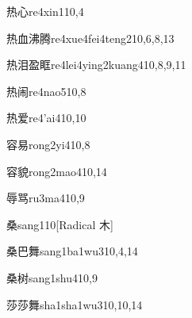 \begin{verbete}{热心}{re4xin1}{10,4}
\end{verbete}

\begin{verbete}{热血沸腾}{re4xue4fei4teng2}{10,6,8,13}
\end{verbete}

\begin{verbete}{热泪盈眶}{re4lei4ying2kuang4}{10,8,9,11}
\end{verbete}

\begin{verbete}{热闹}{re4nao5}{10,8}
\end{verbete}

\begin{verbete}{热爱}{re4'ai4}{10,10}
\end{verbete}

\begin{verbete}{容易}{rong2yi4}{10,8}
\end{verbete}

\begin{verbete}{容貌}{rong2mao4}{10,14}
\end{verbete}

\begin{verbete}{辱骂}{ru3ma4}{10,9}
\end{verbete}

\begin{verbete}{桑}{sang1}{10}[Radical 木]
\end{verbete}

\begin{verbete}{桑巴舞}{sang1ba1wu3}{10,4,14}
\end{verbete}

\begin{verbete}{桑树}{sang1shu4}{10,9}
\end{verbete}

\begin{verbete}{莎莎舞}{sha1sha1wu3}{10,10,14}
\end{verbete}

